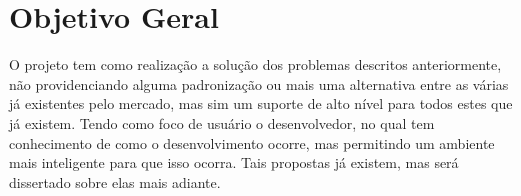 \section{Objetivo Geral}
O projeto tem como realização a solução dos problemas descritos anteriormente, não providenciando alguma padronização ou mais uma alternativa entre as várias já existentes pelo mercado, mas sim um suporte de alto nível para todos estes que já existem. Tendo como foco de usuário o desenvolvedor, no qual tem conhecimento de como o desenvolvimento ocorre, mas permitindo um ambiente mais inteligente para que isso ocorra. Tais propostas já existem, mas será dissertado sobre elas mais adiante.

\iffalse
O objetivo geral deve responder as seguintes perguntas:
1) O que a sua organização deseja realizar com o Projeto?
2) Qual problema em especial se quer solucionar?
3) Que mudanças se quer alcançar?
4) Que diferença o projeto quer fazer?

Deve ser escrito em tempo infinitivo (por exemplo: ampliar, capacitar, entre outros) e redigido com claridade. O objetivo precisa ser alcançável, não pode ser genérico, de forma que o projeto não consiga resolver (ex: terminar com a fome no mundo). Por outro lado deve ser ousado, capaz de sinalizar mudanças mais profundas que poderão ser alcançadas pelo projeto a médio e longo prazo.}
\fi

